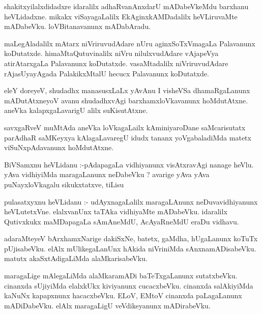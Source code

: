 \documentclass{article}
\begin{document}
\begin{mn}
shakitxyilalxdidadxre  idaralilx  adhaRvanAnxdarU  mADabeVkeMdu  barxhanu  heVLidadxne.  mikakx  
viSayagaLalilx  EkAginxkAMDadalilx  heVLiruvaMte  mADabeVku.  loVBitanavanunx  mADabAradu.
\end{mn}

\begin{mn}
maLegAladalilx  mAtarx  niVriruvudAdare  nUru  aginxSoTxVmagaLa  Palavanunx  koDutatxde.  
himaMtaQutuvinalilx  niVru  nilulxvudAdare  vAjapeVya  atirAtarxgaLa  Palavanunx  koDutatxde.  
vasaMtadalilx  niVriruvudAdare  rAjasUyayAgada  PalakikxMtalU  hecucx  Palavanunx  koDutatxde.  
\end{mn}

\begin{mn}
eleY  doreyeV,  shudadhx  manasusxLaLx  yAvAnu  I  visheVSa  dhamaRgaLanunx  mADutAtxneyoV  avanu  
shudadhxvAgi  barxhamxloVkavanunx  hoMdutAtxne.  aneVka  kalapxgaLavarigU  alilx  suKisutAtxne.
\end{mn}

\begin{mn}
savxgaRveV  muMtAda  aneVka  loVkagaLailx  kAminiyaroDane  saMcarisutatx  parAdhaR  saMKeyxya  
kAlagaLavaregU  idudx  tananx  yoVgabaladiMda  matetx  viSuNxpAdavanunx  hoMdutAtxne.
\end{mn}

\begin{mn}
BiVSamxnu  heVLidanu :-pAdapagaLa  vidhiyanunx  visAtxravAgi  nanage  heVlu.  yAva  vidhiyiMda  
maragaLanunx  neDabeVku ?  avarige  yAva  yAva  puNayxloVkagalu  sikukxtatxve,  tiLisu
\end{mn}

\begin{mn}
pulasatxyxnu  heVLidanu :- udAyxnagaLalilx  maragaLAnunx  neDuvavidhiyanunx  heVLutetxVne.  elalxvanUnx  
taTAka  vidhiyaMte  mADabeVku.  idaralilx  Qutivxkukx  maMDapagaLa  sAmAneMdU,  AcAyaRneMdU  eraDu  vidhavu.
\end{mn}

\begin{mn}
adaraMteyeV  bArxhamxNarige  dakiSxNe,  batetx,  gaMdha,  hUgaLanunx  koTuTx  pUjisabeVku.  elAlx  
mUlikegaLanUnx  hAkida  niVriniMda  sAnxnamADisabeVku.  matutx  akaSxtAdigaLiMda  alaMkarisabeVku.
\end{mn}

\begin{mn}
maragaLige  mAlegaLiMda  alaMkaramADi  baTeTxgaLanunx  sutatxbeVku.  cinanxda  sUjiyiMda  elalxkUkx  
kiviyanunx  cucacxbeVku.  cinanxda  salAkiyiMda  kaNuNx kapapxnunx  hacacxbeVku.  ELoV,  EMtoV  cinanxda  
paLagaLanunx  mADiDabeVku.  elAlx  maragaLigU  veVdikeyanunx  mADirabeVku.  
\end{mn}
\end{document}

